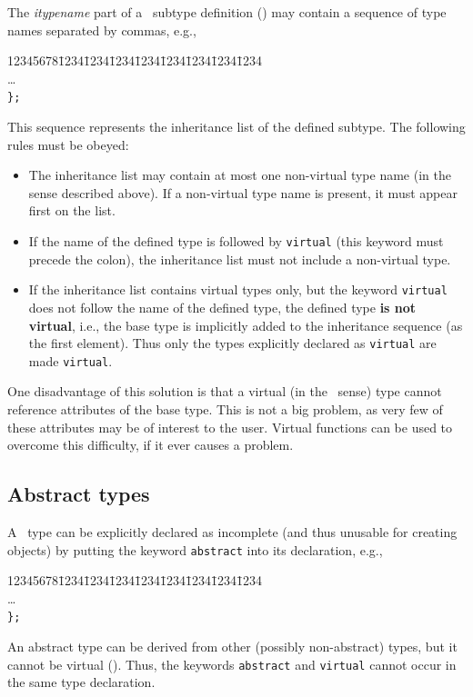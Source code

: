 The {\em itypename\/} part of a \smurph\ subtype definition
() may contain a sequence of type names separated by commas,
e.g.,
{\tt\begin{tabbing}
12345678\=1234\=1234\=1234\=1234\=1234\=1234\=1234\=1234\kill
{}\\
\> \>\ldots \\
\> {\tt \};}
\end{tabbing}}
This sequence represents the inheritance list of the defined subtype.
The following rules must be obeyed:
\begin{itemize}
\item
The inheritance list may contain at most one non-virtual type name (in the
sense described above).
If a non-virtual type name is present, it must appear first on the list.
\item
If the name of the defined type is followed by {\tt virtual} (this keyword
must precede the colon), the inheritance list must not include a
non-virtual type.
\item
If the inheritance list contains virtual types only, but the keyword
{\tt virtual} does not follow the name of the defined type, the defined
type {\bf is not virtual}, i.e., the base type is implicitly added to
the inheritance sequence (as the first element).
Thus only the types explicitly declared as {\tt virtual} are made {\tt virtual}.
\end{itemize}

One disadvantage of this solution is that a virtual (in the \smurph\ sense)
type cannot reference attributes of the base type.
This is not a big problem, as very few of these attributes may be of
interest to the user.
Virtual functions can be used to overcome this difficulty, if it ever
causes a problem.

\subsection{Abstract types}
\label{rm_st_ab}

A \smurph\ type can be explicitly declared as incomplete (and thus unusable
for creating objects) by putting the keyword {\tt abstract} into its
declaration, e.g.,
{\tt\begin{tabbing}
12345678\=1234\=1234\=1234\=1234\=1234\=1234\=1234\=1234\kill
{}\\
\> \>\ldots \\
\> {\tt \};}
\end{tabbing}}
\noindent
An abstract type can be derived from other (possibly non-abstract) types, but
it cannot be virtual ().
Thus, the keywords {\tt abstract} and {\tt virtual} cannot occur in the same
type declaration.

